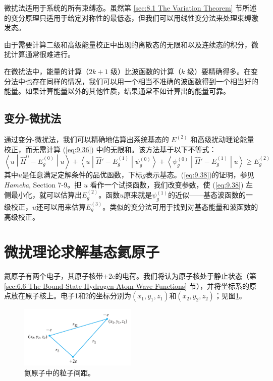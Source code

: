     微扰法适用于系统的所有束缚态。虽然第 \ref{sec:8.1 The Variation Theorem} 节所述的变分原理只适用于给定对称性的最低态，但我们可以用线性变分法来处理束缚激发态。

    由于需要计算二级和高级能量校正中出现的离散态的无限和以及连续态的积分，微扰计算通常很难进行。

    在微扰法中，能量的计算（$2k+1$ 级）比波函数的计算（$k$ 级）要精确得多。在变分法中也存在同样的情况，我们可以用一个相当不准确的波函数得到一个相当好的能量。如果计算能量以外的其他性质，结果通常不如计算出的能量可靠。

\subsection*{变分-微扰法}

    通过变分-微扰法，我们可以精确地估算出系统基态的 $E^{\left(2\right)}$ 和高级扰动理论能量校正，而无需计算 (\ref{eq:9.36}) 中的无限和。该方法基于以下不等式：
    \begin{equation}
        \left\langle u \middle| \hat{H}^0 - E_g^{\left(0\right)} \middle| u \right\rangle + \left\langle u \middle| \hat{H}' - E_g^{\left(1\right)} \middle| \psi_g^{\left(0\right)} \right\rangle + \left\langle \psi_g^{\left(0\right)} \middle| \hat{H}' - E_g^{\left(1\right)} \middle| u \right\rangle \geq E_g^{\left(2\right)}
        \label{eq:9.38}
    \end{equation}
    其中$u$是任意满足定解条件的品优函数，下标$g$表示基态。(\ref{eq:9.38})的证明，参见\textit{Hameka}, Section 7-9。把 $u$ 看作一个试探函数，我们改变参数，使 (\ref{eq:9.38}) 左侧最小化，就可以估算出$E_g^{\left(2\right)}$。函数$u$原来就是$\psi_g^{\left(1\right)}$的近似——基态波函数的一级校正，$u$还可以用来估算$E_g^{\left(3\right)}$。类似的变分法可用于找到对基态能量和波函数的高级校正。

\section{微扰理论求解基态氦原子}
\label{sec:9.3 Perturbation Treatment of the Helium-Atom Ground State}
    氦原子有两个电子，其原子核带$+2\mathrm{e}$的电荷。我们将认为原子核处于静止状态（第 \ref{sec:6.6 The Bound-State Hydrogen-Atom Wave Functions} 节），并将坐标系的原点放在原子核上。电子1和2的坐标分别为$\left(x_1,y_1,z_1\right)$和$\left(x_2,y_2,z_2\right)$；见图\ref{fig:9.1}。
    \begin{figure}[ht]
        \centering
        \includegraphics[width=0.5\textwidth]{Figures/9.1.png}
        \caption{氦原子中的粒子间距。}
        \label{fig:9.1}
    \end{figure}

